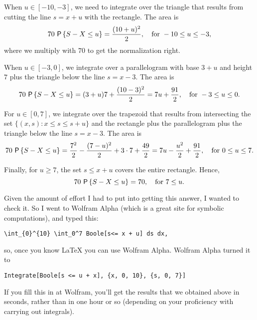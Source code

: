 \begin{exercise}
\begin{solution}
When $u\in[-10, -3]$, we need to integrate over the triangle that results from cutting the line $s=x+u$ with the rectangle. The area is
\begin{equation*}
70\, \P{S-X \leq u}= \frac{(10+u)^2}2, \quad \text{for } -10 \leq u\leq -3,
\end{equation*}
where we multiply with $70$ to get the normalization right.

When $u\in[-3, 0]$, we integrate over a parallelogram with base $3+u$ and height $7$ plus the triangle below the line $s=x-3$. The area is
\begin{equation*}
70\, \P{S-X \leq u}= (3+u)7 + \frac{(10-3)^2}2=7u + \frac{91}2, \quad \text{for } -3 \leq u\leq 0.
\end{equation*}

For $u\in[0, 7]$, we integrate over the trapezoid that results from intersecting the set $\{(x,s) : x \leq s \leq s + u\}$ and the rectangle plus the parallelogram plus the triangle below the line $s=x-3$. The area is
\begin{equation*}
70\, \P{S-X \leq u}= \frac{7^2}2 - \frac{(7-u)^2}{2} + 3\cdot 7 + \frac{49}2 = 7 u - \frac{u^2}2 + \frac{91}2, \quad \text{for } 0\leq u\leq 7.
\end{equation*}

Finally, for $u\geq 7$, the set $s\leq x+u$ covers the entire rectangle. Hence,
\begin{equation*}
70\, \P{S-X \leq u}= 70, \quad \text{for } 7\leq u.
\end{equation*}

Given the amount of effort I had to put into getting this answer, I wanted to check it. So I went to Wolfram Alpha (which is a great site for symbolic computations), and typed this:
\begin{verbatim}
\int_{0}^{10} \int_0^7 Boole[s<= x + u] ds dx,
\end{verbatim}
so, once you know \LaTeX\/ you can use Wolfram Alpha. Wolfram Alpha turned it to
\begin{verbatim}
Integrate[Boole[s <= u + x], {x, 0, 10}, {s, 0, 7}]
\end{verbatim}
If you fill this in at Wolfram, you'll get the results that we obtained above in seconds, rather than in one hour or so (depending on your proficiency with carrying out integrals).
\end{solution}
\end{exercise}


